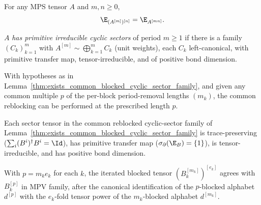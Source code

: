 \begin{lemma}%
    \label{thm:iterated_blocking_transfer}
    \leanok
    For any MPS tensor $A$ and $m,n \ge 0$,
    \[
        \E_{(A^{[m]})^{[n]}} =  \E_{A^{[mn]}}.
    \]
\end{lemma}

\begin{definition}%
    \label{def:primitive_irreducible_cyclic_sectors}
    \leanok
    $A$ \emph{has primitive irreducible cyclic sectors} of period $m \ge 1$ if
    there is a family $(C_k)_{k=1}^m$ with $A^{[m]} \sim \bigoplus_{k=1}^{m} C_k$
    (unit weights), each $C_k$ left-canonical, with primitive transfer map,
    tensor-irreducible, and of positive bond dimension.
\end{definition}

\begin{lemma}%
    \label{thm:exists_common_blocked_cyclic_sector_family_common_multiple}
    \leanok
    With hypotheses as in
    Lemma~\ref{thm:exists_common_blocked_cyclic_sector_family}, and given any
    common multiple $p$ of the per-block period-removal lengths $(m_k)$, the
    common reblocking can be performed at the prescribed length $p$.
\end{lemma}

\begin{lemma}%
    \label{thm:common_blocked_cyclic_sector_derived_properties}
    \leanok
    Each sector tensor in the common reblocked cyclic-sector family of
    Lemma~\ref{thm:exists_common_blocked_cyclic_sector_family} is
    trace-preserving ($\sum_i (B^i)^\dagger B^i = \Id$), has primitive transfer
    map ($\sigma_\partial(\E_B) = \{1\}$), is tensor-irreducible, and has positive
    bond dimension.
\end{lemma}

\begin{lemma}%
    \label{thm:common_blocked_cyclic_sector_reindexed_samempv}
    \leanok
    With $p = m_k e_k$ for each $k$, the iterated blocked tensor
    $(B_k^{[m_k]})^{[e_k]}$ agrees with $B_k^{[p]}$ in MPV family, after the
    canonical identification of the $p$-blocked alphabet $d^{[p]}$ with the
    $e_k$-fold tensor power of the $m_k$-blocked alphabet $d^{[m_k]}$.
\end{lemma}

